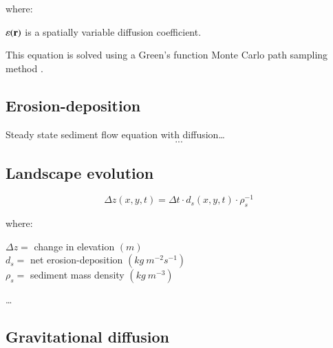 \documentclass[final,3p,times,twocolumn]{elsarticle}
\begin{document}
\noindent
 where:
 
 \noindent
 \hspace*{1em} $\varepsilon({\bf r})$ is a spatially variable diffusion coefficient.

This equation is solved using a Green's function Monte Carlo path sampling method \cite{mitasova2004}.




\subsection{Erosion-deposition}

Steady state sediment flow equation with diffusion\ldots
\begin{equation}\label{eq:sediment} 
...
\end{equation}


\subsection{Landscape evolution}

\begin{equation}
\label{eq:evolution} 
{\Delta z(x,y,t) = \Delta t \cdot d_s(x,y,t) \cdot \rho_s^{-1} }
\end{equation}

\noindent
where: 

\noindent
$\Delta z =$ change in elevation $(m)$ \\
$d_s =$ net erosion-deposition $(kg ~ m^{-2} s^{-1})$ \\
$\rho_s =$ sediment mass density $(kg ~m^{-3})$ \\
\vspace{1em}

\ldots
\cite{mitasova2013}

\subsection{Gravitational diffusion}
\end{document}
